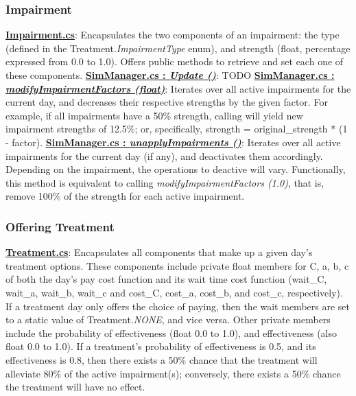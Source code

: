 \documentclass{article}
\begin{document}
\subsubsection*{Impairment} %
\href{https://bit.ly/2JFJ9mj}{\textbf{Impairment.cs}}: Encapsulates the two components of an impairment: the type (defined in the Treatment.\textit{ImpairmentType} enum), and strength (float, percentage expressed from 0.0 to 1.0). Offers public methods to retrieve and set each one of these components. \newline \newline
\href{https://bit.ly/2UhmSzq}{\textbf{SimManager.cs : \textit{Update ()}}}: TODO \newline \newline %
\href{https://bit.ly/2UhmSzq}{\textbf{SimManager.cs : \textit{modifyImpairmentFactors (float)}}}: Iterates over all active impairments for the current day, and decreases their respective strengths by the given factor. For example, if all impairments have a 50\% strength, calling  will yield new impairment strengths of 12.5\%; or, specifically, strength = original\_strength * (1 - factor).  \newline \newline
\href{https://bit.ly/2UhmSzq}{\textbf{SimManager.cs : \textit{unapplyImpairments ()}}}: Iterates over all active impairments for the current day (if any), and deactivates them accordingly. Depending on the impairment, the operations to deactive will vary. Functionally, this method is equivalent to calling \textit{modifyImpairmentFactors (1.0)}, that is, remove 100\% of the strength for each active impairment. 

\subsubsection*{Offering Treatment} %
\href{https://bit.ly/2TwrvAZ}{\textbf{Treatment.cs}}: Encapsulates all components that make up a given day's treatment options. These components include private float members for C, a, b, c of both the day's pay cost function and its wait time cost function (wait\_C, wait\_a, wait\_b, wait\_c and cost\_C, cost\_a, cost\_b, and cost\_c, respectively). If a treatment day only offers the choice of paying, then the wait members are set to a static value of Treatment.\textit{NONE}, and vice versa. Other private members include the probability of effectiveness (float 0.0 to 1.0), and effectiveness (also float 0.0 to 1.0). If a treatment's probability of effectiveness is 0.5, and its effectiveness is 0.8, then there exists a 50\% chance that the treatment will alleviate 80\% of the active impairment(s); conversely, there exists a 50\% chance the treatment will have no effect.
\end{document}
